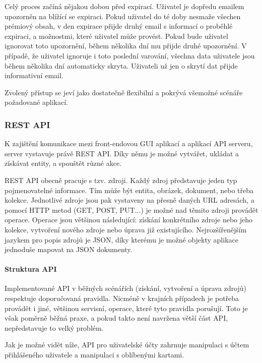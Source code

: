 		Celý proces začíná nějakou dobou před expirací.
		Uživatel je dopředu emailem upozorněn na blížící se expiraci.
		Pokud uživatel do té doby nesmaže všechen prémiový obsah, v den expirace přijde druhý email s informací o
		proběhlé expiraci, a možnostmi, které uživatel může provést.
		Pokud bude uživatel ignorovat toto upozornění, během několika dní mu přijde druhé upozornění.
		V případě, že uživatel ignoruje i toto poslední varování, všechna data uživatele jsou během několika dní
		automaticky skryta.
		Uživateli už jen o skrytí dat přijde informativní email.

		Zvolený přístup se jeví jako dostatečně flexibilní a pokrývá všemožné scénáře požadované aplikací.

		\subsubsection{REST API}

		K zajištění komunikace mezi front-endovou \ac{GUI} aplikací a aplikací \ac{API} serveru, server
		vystavuje právě \ac{REST} \ac{API}.
		Díky němu je možné vytvářet, ukládat a získávat entity, a spouštět různé akce.

		\ac{REST} \ac{API} obecně pracuje s tzv. zdroji.
		Každý zdroj představuje jeden typ pojmenovatelné informace.
		Tím může být entita, obrázek, dokument, nebo třeba kolekce.
		Jednotlivé zdroje jsou pak vystaveny na přesně daných \ac{URL} adresách, a pomocí \ac{HTTP} metod (GET, POST, PUT...)
		je možné nad těmito zdroji provádět operace.
		Operace jsou většinou následující: získání konkrétního zdroje nebo jeho kolekce, vytvoření nového zdroje nebo
		úprava již existujícího.
		Nejrozšířenějším jazykem pro popis zdrojů je \ac{JSON}, díky kterému je možné objekty aplikace jednoduše
		mapovat na \ac{JSON} dokumenty. \cite{restfulapi}

			\paragraph{Struktura API}

			Implementované \ac{API} v běžných scénářích (získání, vytvoření a úprava zdrojů) respektuje doporučovaná pravidla.
			Nicméně v krajních případech je potřeba provádět i jiné, většinou servisní, operace, které tyto pravidla porušují.
			Toto je však poměrně běžná praxe, a pokud takto není navržena větší část \ac{API}, nepředstavuje to velký
			problém.

			Jak je možné vidět níže, \ac{API} pro uživatelské účty zahrnuje manipulaci s účtem přihlášeného uživatele a manipulaci
			s oblíbenými kartami.

